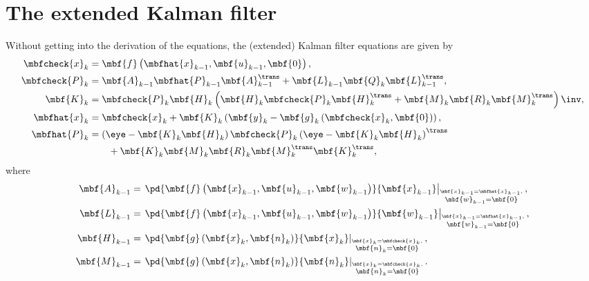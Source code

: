 \documentclass[nobib, nofonts, notoc, justified]{tufte-handout}
\begin{document}
  \section{The extended Kalman filter}
  Without getting into the derivation of the equations, the (extended) Kalman filter equations are given by \cite[eq.~(4.32)]{Barfoot_State_2017}
  \begin{subequations}  
    \label{eq:EKF eqns}
    \begin{align}
      \label{eq:EKF: prediction}
      \mbfcheck{x}_{k} &= \mbf{f}\left( \mbfhat{x}_{k-1}, \mbf{u}_{k-1}, \mbf{0} \right), \\
      \label{eq:EKF: prediction cov}
      \mbfcheck{P}_{k} &= \mbf{A}_{k-1}\mbfhat{P}_{k-1}\mbf{A}_{k-1}^{\trans} + \mbf{L}_{k-1}\mbf{Q}_{k}\mbf{L}_{k-1}^{\trans},\\
      \label{eq:EKF: KF gain}
      \mbf{K}_{k} &= \mbfcheck{P}_{k}\mbf{H}_{k}\left( \mbf{H}_{k}\mbfcheck{P}_{k}\mbf{H}_{k}^{\trans} + \mbf{M}_{k}\mbf{R}_{k}\mbf{M}_{k}^{\trans} \right)\inv,\\
      \label{eq:EKF: correction}
      \mbfhat{x}_{k} &= \mbfcheck{x}_{k} + \mbf{K}_{k}\left( \mbf{y}_{k} - \mbf{g}_{k}\left( \mbfcheck{x}_{k}, \mbf{0} \right) \right),\\
      \label{eq:EKF: correction cov}
      \mbfhat{P}_{k} &= \left( \eye - \mbf{K}_{k}\mbf{H}_{k} \right)\mbfcheck{P}_{k}\left( \eye - \mbf{K}_{k}\mbf{H}_{k} \right)^{\trans} \nonumber\\&\qquad+ \mbf{K}_{k}\mbf{M}_{k}\mbf{R}_{k}\mbf{M}_{k}^{\trans}\mbf{K}_{k}^{\trans},
    \end{align}
  \end{subequations}
  where 
  \begin{align}
    \mbf{A}_{k-1} &= \left.\pd{\mbf{f}\left( \mbf{x}_{k-1}, \mbf{u}_{k-1}, \mbf{w}_{k-1} \right)}{\mbf{x}_{k-1}}\right|_{\overset{\mbf{x}_{k-1}=\mbfhat{x}_{k-1},}{\mbf{w}_{k-1}=\mbf{0}}},\\
    \mbf{L}_{k-1} &= \left.\pd{\mbf{f}\left( \mbf{x}_{k-1}, \mbf{u}_{k-1}, \mbf{w}_{k-1} \right)}{\mbf{w}_{k-1}}\right|_{\overset{\mbf{x}_{k-1}=\mbfhat{x}_{k-1},}{\mbf{w}_{k-1}=\mbf{0}}},\\
    \mbf{H}_{k-1} &= \left.\pd{\mbf{g}\left( \mbf{x}_{k}, \mbf{n}_{k} \right)}{\mbf{x}_{k}}\right|_{\overset{\mbf{x}_{k}=\mbfcheck{x}_{k},}{\mbf{n}_{k}=\mbf{0}}},\\
    \mbf{M}_{k-1} &= \left.\pd{\mbf{g}\left( \mbf{x}_{k}, \mbf{n}_{k} \right)}{\mbf{n}_{k}}\right|_{\overset{\mbf{x}_{k}=\mbfcheck{x}_{k},}{\mbf{n}_{k}=\mbf{0}}}.
  \end{align}
\end{document}
